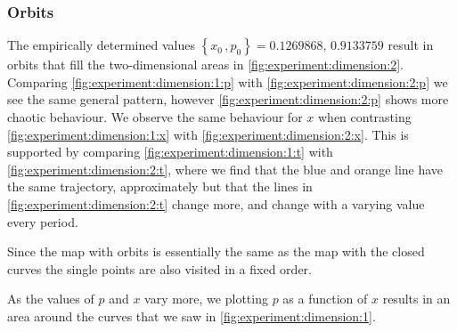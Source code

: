 \subsubsection{Orbits}	
	The empirically determined values $\left\{x_0\,, p_0 \right\} = {\num{0.1269868},\,\num{0.9133759}}$ result in orbits that fill the two-dimensional areas in \cref{fig:experiment:dimension:2}. Comparing \cref{fig:experiment:dimension:1:p} with \cref{fig:experiment:dimension:2:p} we see the same general pattern, however \cref{fig:experiment:dimension:2:p} shows more chaotic behaviour. We observe the same behaviour for $x$ when contrasting \cref{fig:experiment:dimension:1:x} with \cref{fig:experiment:dimension:2:x}. This is supported by comparing \cref{fig:experiment:dimension:1:t} with \cref{fig:experiment:dimension:2:t}, where we find that the blue and orange line have the same trajectory, approximately but that the lines in \cref{fig:experiment:dimension:2:t} change more, and change with a varying value every period.

	Since the map with orbits is essentially the same as the map with the closed curves the single points are also visited in a fixed order. 

	As the values of $p$ and $x$ vary more, we plotting $p$ as a function of $x$ results in an area around the curves that we saw in \cref{fig:experiment:dimension:1}.



